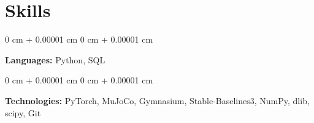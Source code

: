 \documentclass[10pt, letterpaper]{article}
\newenvironment{onecolentry}{
    \begin{adjustwidth}{
        0 cm + 0.00001 cm
    }{
        0 cm + 0.00001 cm
    }
}{
    \end{adjustwidth}
} %
\begin{document}
    \section{Skills}

        \begin{onecolentry}
            \textbf{Languages:} Python, SQL
        \end{onecolentry}

        \vspace{0.10 cm}

        \begin{onecolentry}
            \textbf{Technologies:} PyTorch, MuJoCo, Gymnasium, Stable-Baselines3, NumPy, dlib, scipy, Git
        \end{onecolentry}
\end{document}
